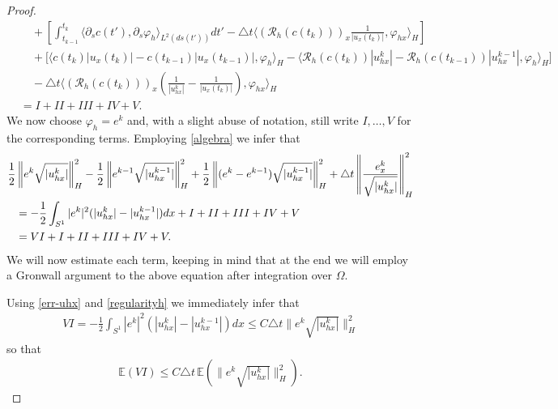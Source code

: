 \documentclass[a4paper,10pt]{article}
\numberwithin{equation}{section}
\begin{document}
\begin{proof}
\begin{align*}
& \quad +\left [ \int_{t_{k-1}}^{t_{k}} \langle \partial_{s} c(t'), \partial_{s} \varphi_{h} \rangle_{L^{2}(ds(t'))} dt' -\triangle t \langle (\mathcal{R}_{h}(c(t_{k})))_{x} \frac{1}{| u_{x}(t_{k})|}, \varphi_{hx} \rangle_{H} \right ]
\\
& \quad +\Big[\langle c(t_{k}) |u_{x}(t_{k})| - c(t_{k-1}) |u_{x}(t_{k-1})|, \varphi_{h}\rangle_{H} -\langle \mathcal{R}_{h}(c(t_{k})) | u^{k}_{hx}| -\mathcal{R}_{h}(c(t_{k-1})) | u^{k-1}_{hx}|, \varphi_{h}\rangle_{H}
\Big]
\\
& \quad
- \triangle t \langle (\mathcal{R}_{h}(c(t_{k})))_{x} ( \frac{1}{| u^{k}_{hx}|} - \frac{1}{| u_{x}(t_{k})|}), \varphi_{hx} \rangle_{H} \\
&=I +II+III+IV+V.
\end{align*}
We now choose $\varphi_{h}=e^{k}$ and, with a slight abuse of notation, still write $I, \ldots, V$ for the corresponding terms. Employing \eqref{algebra}
we infer that
\begin{align} \label{starting-eq}
\frac{1}{2 } & \left \| e^{k}\sqrt{|u^{k}_{hx}|} \right \|^{2}_{H}- \frac{1}{2 } \left \| e^{k-1}\sqrt{|u^{k-1}_{hx}|} \right \|^{2}_{H} + \frac{1}{2 } \left \| (e^{k} -e^{k-1})\sqrt{|u^{k-1}_{hx}|} \right \|^{2}_{H}
+\triangle t \left \| \frac{e_{x}^{k}}{\sqrt{|u^{k}_{hx}| } } \right \|^{2}_{H} \notag \\
&= -\frac{1}{2} \int_{S^{1}}|e^{k}|^{2} (|u^{k}_{hx}|-|u^{k-1}_{hx}|) dx + I +II+III+IV+V \notag\\
&=VI + I +II+III+IV+V.
\end{align}
We will now estimate each term, keeping in mind that at the end we will employ a Gronwall argument to the above equation after integration over $\Omega$.

Using \eqref{err-uhx} and \eqref{regularityh} we immediately infer that
\begin{align*}
VI=-\frac{1}{2} \int_{S^{1}}|e^{k}|^{2} (|u^{k}_{hx}|-|u^{k-1}_{hx}|) dx \leq C \triangle t \| e^{k}\sqrt{|u^{k}_{hx}|} \|^{2}_{H}
\end{align*}
so that
\begin{align}\label{term6}
\mathbb{E}(VI) \leq C \triangle t \,\mathbb{E} ( \| e^{k}\sqrt{|u^{k}_{hx}|} \|^{2}_{H}).
\end{align}


\end{proof}
\end{document}
